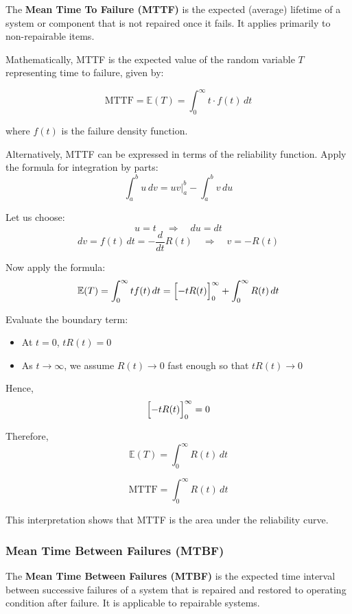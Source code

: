\documentclass[twoside]{book}
\begin{document}
\begin{textbox}
The \textbf{Mean Time To Failure (MTTF)} is the expected (average) lifetime of a system or component that is not repaired once it fails. It applies primarily to non-repairable items.
\end{textbox}

Mathematically, MTTF is the expected value of the random variable $T$ representing time to failure, given by:

\begin{textbox}
\[
\text{MTTF} = \mathbb{E}(T) = \int_0^{\infty} t \cdot f(t) \, dt
\]
\end{textbox}

where $f(t)$ is the failure density function.

Alternatively, MTTF can be expressed in terms of the reliability function. Apply the formula for integration by parts:
\[
\int_a^b u\, dv = uv \big|_a^b - \int_a^b v\, du
\]

Let us choose:
\[
u = t \quad \Rightarrow \quad du = dt
\]
\[
dv = f(t)\,dt  = -\dfrac{d}{dt} R(t)\quad \Rightarrow \quad v = -R(t)
\]

Now apply the formula:
\[
\mathbb{E}(T) = \int_0^\infty t f(t)\, dt = \Bigl[ -t R(t) \Bigr]_0^\infty + \int_0^\infty R(t)\, dt
\]

Evaluate the boundary term:
\begin{itemize}
    \item At \( t = 0 \), \( t R(t) = 0 \)
    \item As \( t \to \infty \), we assume \( R(t) \to 0 \) fast enough so that \( t R(t) \to 0 \)
\end{itemize}
Hence,
\[
\Bigl[ -t R(t) \Bigr]_0^\infty = 0
\]

Therefore,
$$\mathbb{E}(T) = \int_0^\infty R(t)\, dt$$

\begin{textbox}
\[
\text{MTTF} = \int_0^\infty R(t)\, dt
\]
\end{textbox}

This interpretation shows that MTTF is the area under the reliability curve.

\subsubsection{Mean Time Between Failures (MTBF)}

\begin{textbox}
The \textbf{Mean Time Between Failures (MTBF)} is the expected time interval between successive failures of a system that is repaired and restored to operating condition after failure. It is applicable to repairable systems.
\end{textbox}
\end{document}
